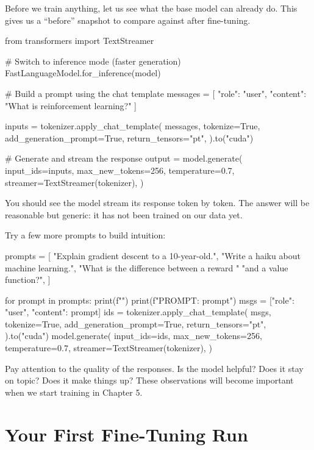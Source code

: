 \begin{chapterenv}
Before we train anything, let us see what the base model can already do. This gives us a ``before'' snapshot to compare against after fine-tuning.

\begin{codeblock}[python]
from transformers import TextStreamer

# Switch to inference mode (faster generation)
FastLanguageModel.for_inference(model)

# Build a prompt using the chat template
messages = [
    {"role": "user",
     "content": "What is reinforcement learning?"}
]

inputs = tokenizer.apply_chat_template(
    messages,
    tokenize=True,
    add_generation_prompt=True,
    return_tensors="pt",
).to("cuda")

# Generate and stream the response
output = model.generate(
    input_ids=inputs,
    max_new_tokens=256,
    temperature=0.7,
    streamer=TextStreamer(tokenizer),
)
\end{codeblock}

You should see the model stream its response token by token. The answer will be reasonable but generic: it has not been trained on our data yet.

Try a few more prompts to build intuition:

\begin{codeblock}[python]
prompts = [
    "Explain gradient descent to a 10-year-old.",
    "Write a haiku about machine learning.",
    "What is the difference between a reward "
    "and a value function?",
]

for prompt in prompts:
    print(f"")
    print(f"PROMPT: {prompt}")
    msgs = [{"role": "user", "content": prompt}]
    ids = tokenizer.apply_chat_template(
        msgs,
        tokenize=True,
        add_generation_prompt=True,
        return_tensors="pt",
    ).to("cuda")
    model.generate(
        input_ids=ids,
        max_new_tokens=256,
        temperature=0.7,
        streamer=TextStreamer(tokenizer),
    )
\end{codeblock}

Pay attention to the quality of the responses. Is the model helpful? Does it stay on topic? Does it make things up? These observations will become important when we start training in Chapter 5.

\section{Your First Fine-Tuning Run}


\end{chapterenv}
